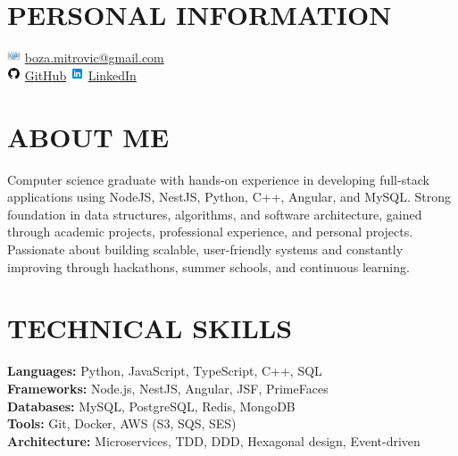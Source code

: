 \documentclass[margin,center]{res}
\begin{document}
\begin{figure}
\hfill{}\vspace*{-1cm}
\end{figure}

\begin{resume}

\section{PERSONAL INFORMATION}
\includegraphics[height=0.4cm]{email.png} \href{mailto:boza.mitrovic@gmail.com}{boza.mitrovic@gmail.com} \\
\includegraphics[height=0.4cm]{github.png} \href{https://github.com/AizenAngel}{GitHub}
\includegraphics[height=0.4cm]{linkedin.png} \href{https://www.linkedin.com/in/bo%C5%BEidar-mitrovi%C4%87-1a379991/}{LinkedIn}

\section{ABOUT ME}
Computer science graduate with hands-on experience in developing full-stack applications using NodeJS, NestJS, Python, C++, Angular, and MySQL. Strong foundation in data structures, algorithms, and software architecture, gained through academic projects, professional experience, and personal projects. Passionate about building scalable, user-friendly systems and constantly improving through hackathons, summer schools, and continuous learning.

\section{TECHNICAL SKILLS}
\textbf{Languages:} Python, JavaScript, TypeScript, C++, SQL \\
\textbf{Frameworks:} Node.js, NestJS, Angular, JSF, PrimeFaces \\
\textbf{Databases:} MySQL, PostgreSQL, Redis, MongoDB \\
\textbf{Tools:} Git, Docker, AWS (S3, SQS, SES) \\
\textbf{Architecture:} Microservices, TDD, DDD, Hexagonal design, Event-driven


\end{resume}
\end{document}
